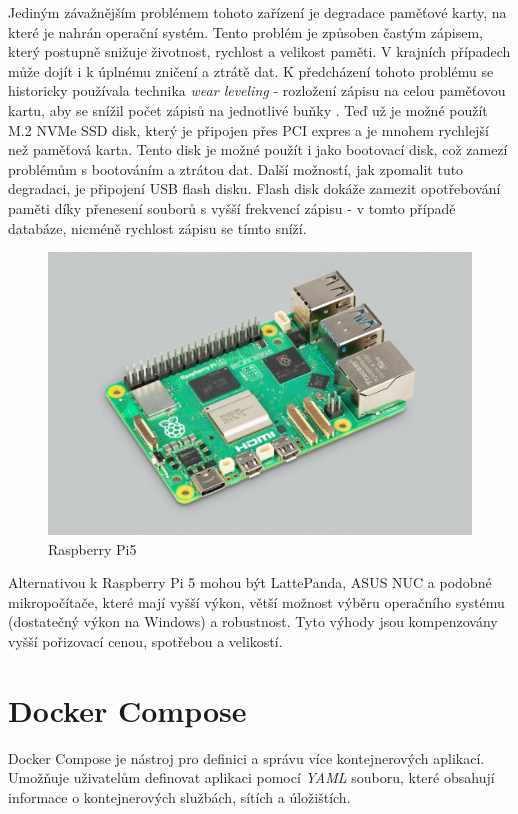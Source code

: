 Jediným závažnějším problémem tohoto zařízení je degradace paměťové karty, na které je nahrán operační systém. Tento problém je způsoben častým zápisem, který postupně snižuje životnost, rychlost a velikost paměti. V krajních případech může dojít i k úplnému zničení a ztrátě dat. K předcházení tohoto problému se historicky používala technika \textit{wear leveling} - rozložení zápisu na celou paměťovou kartu, aby se snížil počet zápisů na jednotlivé buňky \cite{wear leveling}. Teď už je možné použít M.2 NVMe SSD disk, který je připojen přes PCI expres a je mnohem rychlejší než paměťová karta. Tento disk je možné použít i jako bootovací disk, což zamezí problémům s bootováním a ztrátou dat. Další možností, jak zpomalit tuto degradaci, je připojení USB flash disku. Flash disk dokáže zamezit opotřebování paměti díky přenesení souborů s vyšší frekvencí zápisu - v tomto případě databáze, nicméně rychlost zápisu se tímto sníží.
\begin{figure}[!ht]
    \begin{center}
        \includegraphics[scale=0.30]{obrazky/RaspberryPi5.jpg}
    \end{center}
    \caption[Raspberry Pi5~\cite{Raspberry Pi 5}]{Raspberry Pi5~\cite{Raspberry Pi 5}}
    \label{fig:RaspberryPi}
\end{figure}
\newpage
Alternativou k Raspberry Pi 5 mohou být LattePanda, ASUS NUC a podobné mikropočítače, které mají vyšší výkon, větší možnost výběru operačního systému (dostatečný výkon na Windows) a robustnost. Tyto výhody jsou kompenzovány vyšší pořizovací cenou, spotřebou a velikostí.
\section{Docker Compose}
Docker Compose je nástroj pro definici a správu více kontejnerových aplikací. Umožňuje uživatelům definovat aplikaci pomocí \textit{YAML} souboru, které obsahují informace o kontejnerových službách, sítích a úložištích. \cite{Docker Compose}


